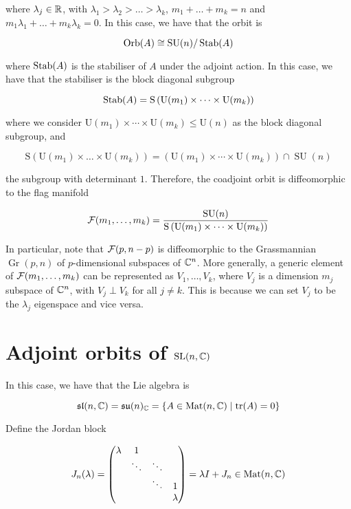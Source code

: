 \documentclass{article}
\renewcommand{\sl}{\mfs\mfl}
\DeclareMathOperator{\SU}{SU}
\newcommand{\su}{\mfs\mfu}
\newcommand{\rS}{\mathrm{S}}
\newcommand{\rU}{\mathrm{U}}
\DeclareMathOperator{\Gr}{Gr}
\begin{document}
where \(\lambda_j \in \mathbb{R}\), with \(\lambda_1 > \lambda_2 > \dots > \lambda_k\), \(m_1 + \dots + m_k = n\) and \(m_1\lambda_1 + \dots + m_k\lambda_k = 0\). In this case, we have that the orbit is

\[\Orb(A) \cong \SU(n)/\Stab(A)\]

where \(\operatorname{Stab}(A)\) is the stabiliser of \(A\) under the adjoint action. In this case, we have that the stabiliser is the block diagonal subgroup

\[\Stab(A) = \rS\left(\rU(m_1) \times \dots \times \rU(m_k)\right)\]

where we consider \(\rU(m_1) \times \cdots \times \rU(m_k) \le \rU(n)\) as the block diagonal subgroup, and

\[\rS\left(\rU(m_1) \times \dots \times \rU(m_k)\right) = \left(\rU(m_1) \times \cdots \times \rU(m_k)\right) \cap \SU(n)\]

the subgroup with determinant \(1\). Therefore, the coadjoint orbit is diffeomorphic to the flag manifold

\[\mcF(m_1, \dots, m_k) = \frac{\SU(n)}{\rS\left(\rU(m_1) \times \cdots \times \rU(m_k)\right)}\]

In particular, note that \(\mathcal{F}(p, n-p)\) is diffeomorphic to the Grassmannian \(\Gr(p, n)\) of \(p\)-dimensional subspaces of \(\mathbb{C}^n\). More generally, a generic element of \(\mathcal{F}(m_1, \dots, m_k)\) can be represented as \(V_1, \dots, V_k\), where \(V_j\) is a dimension \(m_j\) subspace of \(\mathbb{C}^n\), with \(V_j \perp V_k\) for all \(j \ne k\). This is because we can set \(V_j\) to be the \(\lambda_j\) eigenspace and vice versa.

\section{Adjoint orbits of \(\operatorname{SL}(n, \mathbb{C})\)}

In this case, we have that the Lie algebra is

\[\sl(n, \C) = \su(n)_\C = \left\{A \in \Mat(n, \C) \mid \tr(A) = 0\right\}\]

Define the Jordan block

\[J_n(\lambda) = \begin{pmatrix}
    \lambda & 1 \\
    & \ddots & \ddots \\
    & & \ddots & 1 \\
    & & & \lambda
\end{pmatrix} = \lambda I + J_n \in \operatorname{Mat}(n, \mathbb{C})\]
\end{document}
